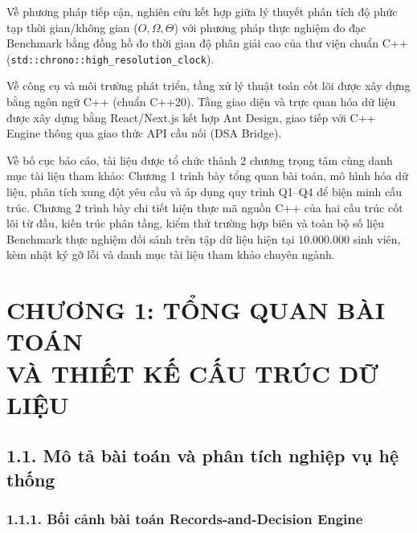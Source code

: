 \documentclass[14pt,a4paper]{extarticle}
\begin{document}
Về phương pháp tiếp cận, nghiên cứu kết hợp giữa lý thuyết phân tích độ phức tạp thời gian/không gian ($O, \Omega, \Theta$) với phương pháp thực nghiệm đo đạc Benchmark bằng đồng hồ đo thời gian độ phân giải cao của thư viện chuẩn C++ (\texttt{std::}\allowbreak\texttt{chrono::}\allowbreak\texttt{high\_}\allowbreak\texttt{resolution\_clock}).

Về công cụ và môi trường phát triển, tầng xử lý thuật toán cốt lõi được xây dựng bằng ngôn ngữ C++ (chuẩn C++20). Tầng giao diện và trực quan hóa dữ liệu được xây dựng bằng React/Next.js kết hợp Ant Design, giao tiếp với C++ Engine thông qua giao thức API cầu nối (DSA Bridge).

Về bố cục báo cáo, tài liệu được tổ chức thành 2 chương trọng tâm cùng danh mục tài liệu tham khảo: Chương 1 trình bày tổng quan bài toán, mô hình hóa dữ liệu, phân tích xung đột yêu cầu và áp dụng quy trình Q1--Q4 để biện minh cấu trúc. Chương 2 trình bày chi tiết hiện thực mã nguồn C++ của hai cấu trúc cốt lõi từ đầu, kiến trúc phân tầng, kiểm thử trường hợp biên và toàn bộ số liệu Benchmark thực nghiệm đối sánh trên tập dữ liệu hiện tại $10.000.000$ sinh viên, kèm nhật ký gỡ lỗi và danh mục tài liệu tham khảo chuyên ngành.

\newpage
\section*{CHƯƠNG 1: TỔNG QUAN BÀI TOÁN\\VÀ THIẾT KẾ CẤU TRÚC DỮ LIỆU}
{}

\subsection*{1.1. Mô tả bài toán và phân tích nghiệp vụ hệ thống}
{}

\subsubsection*{1.1.1. Bối cảnh bài toán Records-and-Decision Engine}
{}
\end{document}
